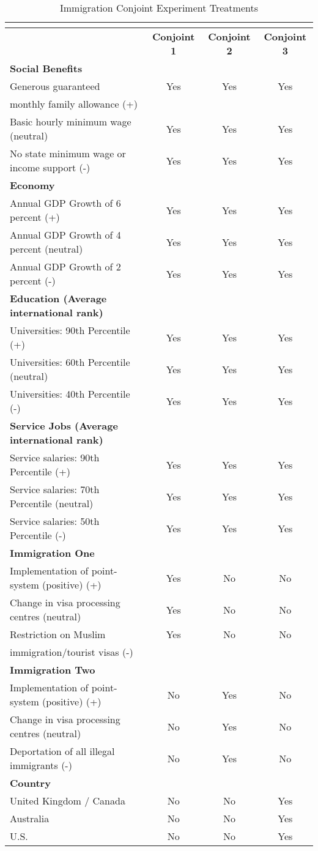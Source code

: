 \begin{table}
\caption{Immigration Conjoint Experiment Treatments}\label{tab:attributes}
\begin{center}
\begin{tabular}{lccc}\footnotesize
&\multicolumn{3}{c}{\textbf{}} \\
\hline\hline&\bf  Conjoint 1 & \bf  Conjoint 2 & \bf  Conjoint 3 \\
\hline
\bf Social Benefits &  & & \\
Generous guaranteed& Yes & Yes & Yes \\
monthly family allowance (+)&  &  &  \\
Basic hourly minimum wage (neutral)& Yes & Yes  & Yes \\
No state minimum wage or income support (-)& Yes & Yes & Yes  \\
\hline
\bf Economy  &  & & \\
Annual GDP Growth of 6 percent (+)& Yes & Yes & Yes \\
Annual GDP Growth of 4 percent (neutral)& Yes & Yes  & Yes \\
Annual GDP Growth of 2 percent (-)& Yes & Yes & Yes  \\
\hline
\bf Education (Average international rank)      & & & \\
Universities: 90th Percentile (+)& Yes & Yes & Yes \\
Universities: 60th Percentile (neutral)& Yes & Yes  & Yes \\
Universities: 40th Percentile (-)& Yes & Yes & Yes  \\
\hline
\bf Service Jobs (Average international rank)  & & & \\
Service salaries: 90th Percentile (+)& Yes & Yes & Yes \\
Service salaries: 70th Percentile (neutral)& Yes & Yes  & Yes \\
Service salaries: 50th Percentile (-)& Yes & Yes & Yes  \\
\hline
\bf Immigration One   & & & \\
  Implementation of point-system (positive) (+)& Yes & No & No \\
Change in visa processing centres (neutral)& Yes & No  & No \\
 Restriction on Muslim & Yes & No & No  \\
immigration/tourist visas (-)&  &  &   \\
\hline
\bf Immigration Two   & & & \\
  Implementation of point-system (positive) (+)& No & Yes & No \\
Change in visa processing centres (neutral)& No & Yes  & No \\
  Deportation of all illegal immigrants (-)& No & Yes & No  \\
\hline
\bf Country    &  & & \\
United Kingdom / Canada & No & No & Yes \\
Australia & No & No  & Yes \\
U.S. & No & No & Yes \\
\hline\hline
\end{tabular}
\end{center}
\end{table}